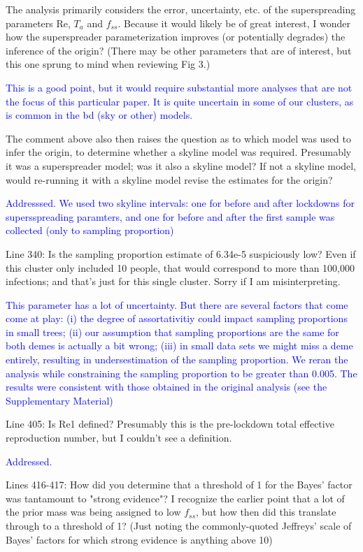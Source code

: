\documentclass[pdflatex,sn-nature]{sn-jnl}%
\begin{document}
The analysis primarily considers the error, uncertainty, etc. of the superspreading parameters Re, $T_a$ and $f_{ss}$. Because it would likely be of great interest, I wonder how the superspreader parameterization improves (or potentially degrades) the inference of the origin? (There may be other parameters that are of interest, but this one sprung to mind when reviewing Fig 3.)

\textcolor{blue}{This is a good point, but it would require substantial more analyses that are not the focus of this particular paper. It is quite uncertain in some of our clusters, as is common in the bd (sky or other) models.}

The comment above also then raises the question as to which model was used to infer the origin, to determine whether a skyline model was required. Presumably it was a superspreader model; was it also a skyline model? If not a skyline model, would re-running it with a skyline model revise the estimates for the origin?

\textcolor{blue}{Addresssed. We used two skyline intervals: one for before and after lockdowns for supersspreading paramters, and one for before and after the first sample was collected (only to sampling proportion)}

Line 340: Is the sampling proportion estimate of 6.34e-5 suspiciously low? Even if this cluster only included 10 people, that would correspond to more than 100,000 infections; and that's just for this single cluster. Sorry if I am misinterpreting.

\textcolor{blue}{This parameter has a lot of uncertainty. But there are several factors that come come at play: (i) the degree of assortativitiy could impact sampling proportions in small trees; (ii) our assumption that sampling proportions are the same for both demes is actually a bit wrong; (iii) in small data sets we might miss a deme entirely, resulting in undersestimation of the sampling proportion. We reran the analysis while constraining the sampling proportion to be greater than 0.005. The results were consistent with those obtained in the original analysis (see the Supplementary Material)}

Line 405: Is Re1 defined? Presumably this is the pre-lockdown total effective reproduction number, but I couldn't see a definition.

\textcolor{blue}{Addressed.}

Lines 416-417: How did you determine that a threshold of 1 for the Bayes' factor was tantamount to "strong evidence"? I recognize the earlier point that a lot of the prior mass was being assigned to low $f_{ss}$, but how then did this translate through to a threshold of 1? (Just noting the commonly-quoted Jeffreys' scale of Bayes' factors for which strong evidence is anything above 10)
\end{document}

